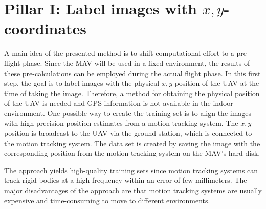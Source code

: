 \documentclass{report}
\begin{document}
\section{Pillar I: Label images with $x,y$-coordinates}
\label{sec:mapping}


A main idea of the presented method is to shift computational effort
to a pre-flight phase. Since the MAV will be used in a fixed
environment, the results of these pre-calculations can be employed
during the actual flight phase. In this first step, the goal is to
label images with the physical $x,y$-position of the UAV at the time
of taking the image. Therefore, a method for obtaining the physical
position of the UAV is needed and GPS information is not available in
the indoor environment. One possible way to create the training set is
to align the images with high-precision position estimates from a
motion tracking system.
The $x,y$-position is broadcast to the UAV via the ground station,
which is connected to the motion tracking system.  The data set is
created by saving the image with the corresponding position from the
motion tracking system on the MAV's hard disk.

The approach yields high-quality training sets since motion tracking
systems can track rigid bodies at a high frequency within an error of
few millimeters. The major disadvantages of the approach are that
motion tracking systems are usually expensive and time-consuming to
move to different environments.
\end{document}
